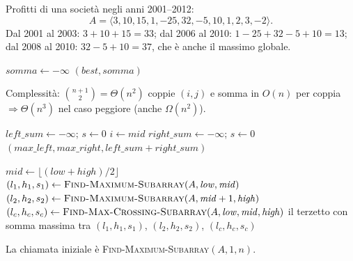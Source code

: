 \begin{esempio}
	Profitti di una società negli anni 2001--2012:
	\[
	A=\langle 3,10,15,1,-25,32,-5,10,1,2,3,-2\rangle.
	\]
	Dal 2001 al 2003: $3+10+15=33$; dal 2006 al 2010: $1-25+32-5+10=13$;
	dal 2008 al 2010: $32-5+10=37$, che è anche il massimo globale.
\end{esempio}

\begin{algorithm}[H]
	\caption{\textsc{MassimoSottoarrayForzaBruta}$(A)$}
	$\mathit{somma}\gets-\infty$\;
	\Return $(\mathit{best},\mathit{somma})$\;
\end{algorithm}
Complessità: $\binom{n+1}{2}=\Theta(n^2)$ coppie $(i,j)$ e somma in $O(n)$ per coppia $\Rightarrow\Theta(n^3)$ nel caso peggiore (anche $\Omega(n^2)$).

\begin{algorithm}[H]
	\caption{\textsc{Find-Max-Crossing-Subarray}$(A,\mathit{low},\mathit{mid},\mathit{high})$}
	$\mathit{left\_sum}\gets-\infty$;\; $s\gets 0$\;
	$i\gets \mathit{mid}$\;
	$\mathit{right\_sum}\gets-\infty$;\; $s\gets 0$\;
	\Return $(\mathit{max\_left},\mathit{max\_right},\mathit{left\_sum}+\mathit{right\_sum})$\;
\end{algorithm}

\begin{algorithm}[H]
	\caption{\textsc{Find-Maximum-Subarray}$(A,\mathit{low},\mathit{high})$}
	$\mathit{mid}\gets\lfloor(\mathit{low}+\mathit{high})/2\rfloor$\;
	$(l_1,h_1,s_1)\gets\textsc{Find-Maximum-Subarray}(A,\mathit{low},\mathit{mid})$\;
	$(l_2,h_2,s_2)\gets\textsc{Find-Maximum-Subarray}(A,\mathit{mid}+1,\mathit{high})$\;
	$(l_c,h_c,s_c)\gets\textsc{Find-Max-Crossing-Subarray}(A,\mathit{low},\mathit{mid},\mathit{high})$\;
	\Return il terzetto con somma massima tra $(l_1,h_1,s_1)$, $(l_2,h_2,s_2)$, $(l_c,h_c,s_c)$\;
\end{algorithm}
La chiamata iniziale è \textsc{Find-Maximum-Subarray}$(A,1,n)$.

